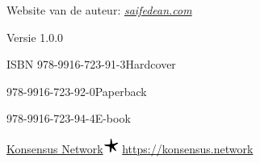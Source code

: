 \documentclass[smalldemyvopaper,11pt,twoside,onecolumn,openright,extrafontsizes]{memoir}
\newcommand{\ISBNHC}{978-9916-723-91-3}
\newcommand{\ISBNSC}{978-9916-723-92-0}
\newcommand{\ISBNEBOOK}{978-9916-723-94-4}
\newcommand{\press}{Konsensus Network}
\begin{document}
\begin{scriptsize}
\noindent Website van de auteur: \href{https://saifedean.com}{\textit{saifedean.com}}


\vspace{0.5\baselineskip}

\noindent Versie 1.0.0

\vspace{0.5\baselineskip}

\setlength{\parindent}{2em}%
\noindent ISBN \ISBNHC \:Hardcover

\hspace{0.28\parindent}\ISBNSC \:Paperback

\hspace{0.28\parindent}\ISBNEBOOK \:E-book
\setlength{\parindent}{0pt}

\end{scriptsize}
\vspace{3em}

\par
\noindent \href{https://konsensus.network}{\large\MakeUppercase \press  \hfill \includegraphics[width=0.5cm]{freestarfish.png}} \space\url{https://konsensus.network}


\setcounter{footnote}{0}
\clearpage

\paragraph{}
\paragraph{}
\paragraph{}
\paragraph{}
\begin{center}
\itshape\large{}
\end{center}
\cleardoublepage
\normalfont

\pagestyle{empty}
\tableofcontents*
\thispagestyle{empty}
\pagestyle{mystyle}
\end{document}
